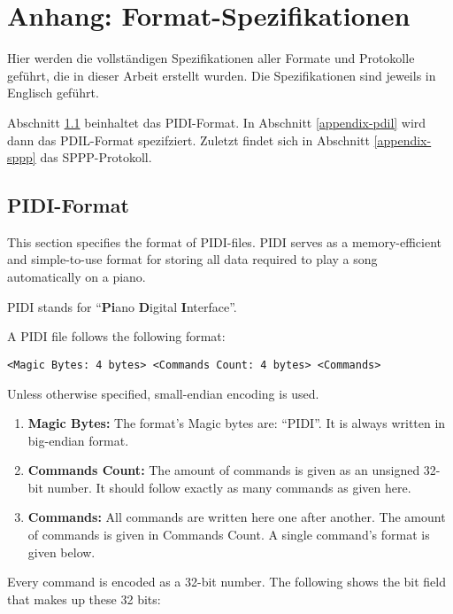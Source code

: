 \chapter{Anhang: Format-Spezifikationen} \label{appendix-demo}

Hier werden die vollständigen Spezifikationen aller Formate und Protokolle geführt, die in dieser Arbeit erstellt wurden.
Die Spezifikationen sind jeweils in Englisch geführt.

Abschnitt \ref{appendix-pidi} beinhaltet das \ac{PIDI}-Format.
In Abschnitt \ref{appendix-pdil} wird dann das \ac{PDIL}-Format spezifziert.
Zuletzt findet sich in Abschnitt \ref{appendix-sppp} das \ac{SPPP}-Protokoll.

\section{\ac{PIDI}-Format} \label{appendix-pidi}

This section specifies the format of PIDI-files.
PIDI serves as a memory-efficient and simple-to-use format for storing all data required to play a song automatically on a piano.

PIDI stands for \enquote{\textbf{Pi}ano \textbf{D}igital \textbf{I}nterface}.

A PIDI file follows the following format:

\begin{verbatim}
<Magic Bytes: 4 bytes> <Commands Count: 4 bytes> <Commands>
\end{verbatim}

Unless otherwise specified, small-endian encoding is used.

\begin{enumerate}
	\item \textbf{Magic Bytes:} The format's Magic bytes are: \enquote{PIDI}. It is always written in big-endian format.
	\item \textbf{Commands Count:} The amount of commands is given as an unsigned 32-bit number. It should follow exactly as many commands as given here.
	\item \textbf{Commands:} All commands are written here one after another. The amount of commands is given in Commands Count. A single command's format is given below.
\end{enumerate}

Every command is encoded as a 32-bit number. The following shows the bit field that makes up these 32 bits:


